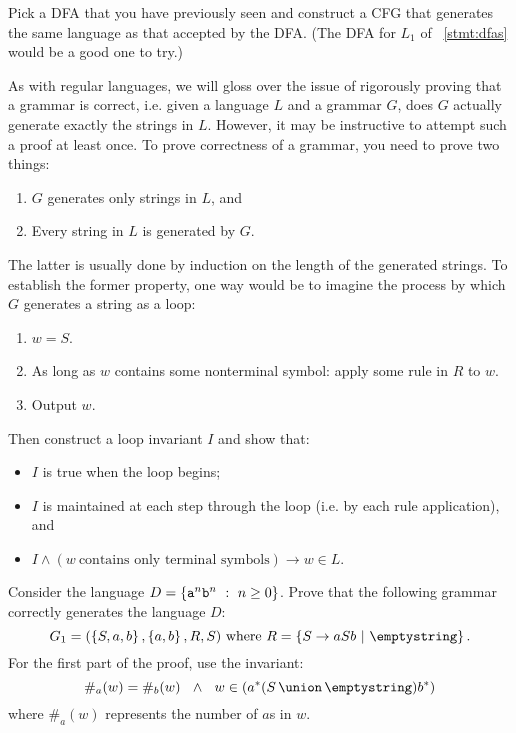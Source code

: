 \documentclass[twoside,letterpaper,openany]{book}
\begin{document}
\begin{exer1}
Pick a DFA that you have previously seen and construct a CFG that generates the same language as that accepted by the DFA. (The DFA for $L_1$ of \stmtword~\ref{stmt:dfas} would be a good one to try.)
\end{exer1}

\begin{discussion}
As with regular languages, we will gloss over the issue of rigorously proving that  a grammar is correct, i.e. given a language $L$ and a grammar $G$, does $G$ actually generate exactly the strings in $L$. However, it may be instructive to attempt such a proof at least once. To prove correctness of a grammar, you need to prove two things:
\begin{enumerate}
\item $G$ generates only strings in $L$, and
\item Every string in $L$ is generated by $G$.
\end{enumerate}
The latter is usually done by induction on the length of the generated strings.
To establish the former property, one way would be to imagine the process by which $G$ generates a string as a loop:
\begin{enumerate}
\item $w = S$.
\item As long as $w$ contains some nonterminal symbol: apply some rule in $R$ to $w$.
\item Output $w$.
\end{enumerate}
Then construct a loop invariant $I$ and show that:
\begin{itemize}
\item $I$ is true when the loop begins;
\item $I$ is maintained at each step through the loop (i.e. by each rule application), and
\item $I \wedge (w~\textrm{contains only terminal symbols}) \rightarrow w \in L$.
\end{itemize}
\end{discussion}

\begin{stmt}[OPTIONAL]
Consider the language $D = \left\lbrace {\texttt{a}}^n {\texttt{b}}^n\ :\ n \geq 0 \right\rbrace$. Prove that the following grammar correctly generates the language $D$: 
\[G_1 = (\setdef{S, a, b}, \setdef{a, b}, R, S) ~\textrm{where}~ R = \setdef{S \to aSb~|~\emptystring}.\]
\hint For the first part of the proof, use the invariant:
\[
 \#_a(w) = \#_b(w) ~~ \wedge ~~ w \in (\setstar{a}(\setunion{S}{\emptystring})\setstar{b})
\]
where $\#_a(w)$ represents the number of $a$s in $w$. 
\end{stmt}
\end{document}
